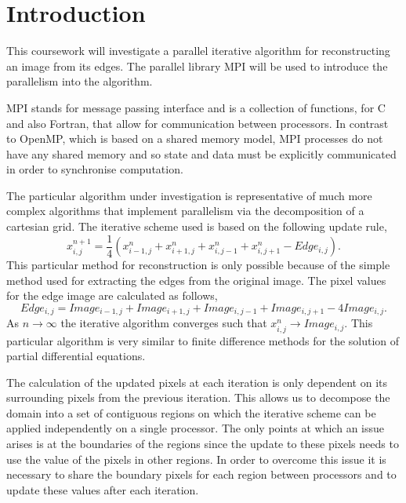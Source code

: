 \documentclass[12pt]{article}
\begin{document}
\maketitle

\section{Introduction}

This coursework will investigate a parallel iterative algorithm for reconstructing an image from its edges. The parallel library MPI will be used to introduce the parallelism into the algorithm.

MPI stands for message passing interface and is a collection of functions, for C and also Fortran, that allow for communication between processors. In contrast to OpenMP, which is based on a shared memory model, MPI processes do not have any shared memory and so state and data must be explicitly communicated in order to synchronise computation. 

The particular algorithm under investigation is representative of much more complex algorithms that implement parallelism via the decomposition of a cartesian grid. The iterative scheme used is based on the following update rule,
\begin{equation}
	x_{i,j}^{n+1} = \frac{1}{4}(x_{i-1,j}^{n} + x_{i+1,j}^{n} + x_{i,j-1}^{n} + x_{i,j+1}^{n} - Edge_{i,j}).
\end{equation} 
This particular method for reconstruction is only possible because of the simple method used for extracting the edges from the original image. The pixel values for the edge image are calculated as follows,
\begin{equation}
	Edge_{i,j} = Image_{i-1,j}+Image_{i+1,j}+Image_{i,j-1}+Image_{i,j+1}-4Image_{i,j}.
\end{equation} 
As $n \rightarrow \infty$ the iterative algorithm converges such that $x_{i,j}^{n} \rightarrow Image_{i,j}$. This particular algorithm is very similar to finite difference methods for the solution of partial differential equations.

The calculation of the updated pixels at each iteration is only dependent on its surrounding pixels from the previous iteration. This allows us to decompose the domain into a set of contiguous regions on which the iterative scheme can be applied independently on a single processor. The only points at which an issue arises is at the boundaries of the regions since the update to these pixels needs to use the value of the pixels in other regions. In order to overcome this issue it is necessary to share the boundary pixels for each region between processors and to update these values after each iteration.  
\end{document}
